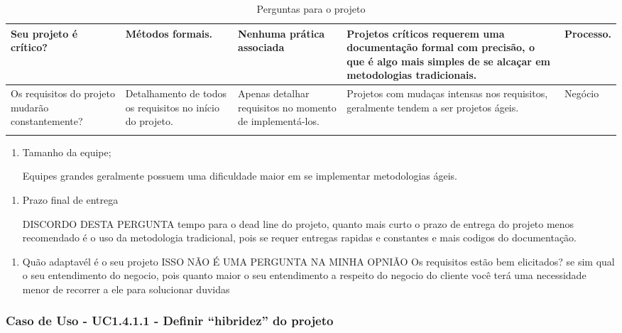 \begin{longtable}{|p{3.5cm}|p{3.5cm}|p{3.5cm}|p{3.5cm}|p{2cm}|}
						Seu projeto é crítico? &
						Métodos formais. &
						Nenhuma prática associada &
						Projetos críticos requerem uma documentação formal com precisão, o que é algo mais simples de se alcaçar em metodologias tradicionais. &
						Processo.
						\\ \hline

						Os requisitos do projeto mudarão constantemente? &
						Detalhamento de todos os requisitos no início do projeto. &
						Apenas detalhar requisitos no momento de implementá-los. &
						Projetos com mudaças intensas nos requisitos, geralmente tendem a ser projetos ágeis. &
						Negócio
						\\ \hline
					\caption{Perguntas para o projeto}
					\label{tab:perguntas_projeto}
					\end{longtable}

					\begin{enumerate}
						\item Tamanho da equipe;

							Equipes grandes geralmente possuem uma dificuldade maior em se implementar metodologias ágeis.
					\end{enumerate}
		
					\begin{enumerate}						
						\item Prazo final de entrega

							DISCORDO DESTA PERGUNTA
							tempo para o dead line do projeto, quanto mais curto o prazo de entrega do projeto menos recomendado é o uso da metodologia tradicional, pois se requer entregas rapidas e constantes e mais codigos do documentação.

					\end{enumerate}
								\begin{enumerate}
						

						
						\item Quão adaptavél é o seu projeto
							ISSO NÃO É UMA PERGUNTA NA MINHA OPNIÃO
							Os requisitos estão bem elicitados? se sim qual o seu entendimento do negocio, pois quanto maior o seu entendimento a respeito do negocio do cliente você terá uma necessidade menor de recorrer a ele para solucionar duvidas
					\end{enumerate}
	
\subsubsection{Caso de Uso - UC1.4.1.1 - Definir ``hibridez'' do projeto}
